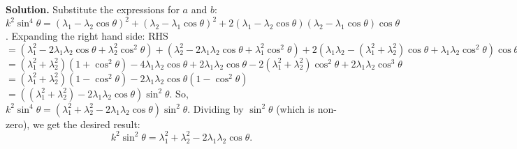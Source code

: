 \documentclass[12pt, a4paper, oneside]{article}
\newenvironment{solution}
  {\par\noindent\textbf{Solution. }\newline}
  {\par}
\begin{document}
\begin{solution}
Substitute the expressions for $a$ and $b$:
$k^2\sin^4\theta = (\lambda_1-\lambda_2\cos\theta)^2 + (\lambda_2-\lambda_1\cos\theta)^2 + 2(\lambda_1-\lambda_2\cos\theta)(\lambda_2-\lambda_1\cos\theta)\cos\theta$.
Expanding the right hand side:
RHS $= (\lambda_1^2 - 2\lambda_1\lambda_2\cos\theta + \lambda_2^2\cos^2\theta) + (\lambda_2^2 - 2\lambda_1\lambda_2\cos\theta + \lambda_1^2\cos^2\theta) + 2(\lambda_1\lambda_2 - (\lambda_1^2+\lambda_2^2)\cos\theta + \lambda_1\lambda_2\cos^2\theta)\cos\theta$
$= (\lambda_1^2+\lambda_2^2)(1+\cos^2\theta) - 4\lambda_1\lambda_2\cos\theta + 2\lambda_1\lambda_2\cos\theta - 2(\lambda_1^2+\lambda_2^2)\cos^2\theta + 2\lambda_1\lambda_2\cos^3\theta$
$= (\lambda_1^2+\lambda_2^2)(1-\cos^2\theta) - 2\lambda_1\lambda_2\cos\theta(1-\cos^2\theta)$
$= ((\lambda_1^2+\lambda_2^2) - 2\lambda_1\lambda_2\cos\theta)\sin^2\theta$.
So, $k^2\sin^4\theta = (\lambda_1^2+\lambda_2^2-2\lambda_1\lambda_2\cos\theta)\sin^2\theta$.
Dividing by $\sin^2\theta$ (which is non-zero), we get the desired result:
$$ k^2\sin^2\theta = \lambda_1^2+\lambda_2^2-2\lambda_1\lambda_2\cos\theta. $$
\end{solution}
\end{document}
